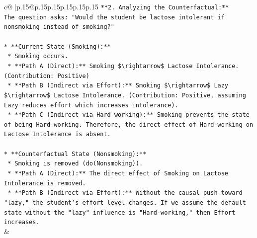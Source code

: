 \documentclass{article}
\begin{document}
{\begin{supertabular}{c@{$\;$}|p{.15\linewidth}@{}p{.15\linewidth}p{.15\linewidth}p{.15\linewidth}p{.15\linewidth}p{.15\linewidth}}
{{{\texttt{**2. Analyzing the Counterfactual:**} \\
\texttt{The question asks: "Would the student be lactose intolerant if nonsmoking instead of smoking?"} \\
\\ 
\texttt{*   **Current State (Smoking):**} \\
\texttt{    *   Smoking occurs.} \\
\texttt{    *   **Path A (Direct):** Smoking \$\textbackslash{}rightarrow\$ Lactose Intolerance. (Contribution: Positive)} \\
\texttt{    *   **Path B (Indirect via Effort):** Smoking \$\textbackslash{}rightarrow\$ Lazy \$\textbackslash{}rightarrow\$ Lactose Intolerance. (Contribution: Positive, assuming Lazy reduces effort which increases intolerance).} \\
\texttt{    *   **Path C (Indirect via Hard{-}working):** Smoking prevents the state of being Hard{-}working. Therefore, the direct effect of Hard{-}working on Lactose Intolerance is absent.} \\
\\ 
\texttt{*   **Counterfactual State (Nonsmoking):**} \\
\texttt{    *   Smoking is removed (do(Nonsmoking)).} \\
\texttt{    *   **Path A (Direct):** The direct effect of Smoking on Lactose Intolerance is removed.} \\
\texttt{    *   **Path B (Indirect via Effort):** Without the causal push toward "lazy," the student's effort level changes. If we assume the default state without the "lazy" influence is "Hard{-}working," then Effort increases.} \\
            }
        }
    }
    & \\ \\


\end{supertabular}}
\end{document}
